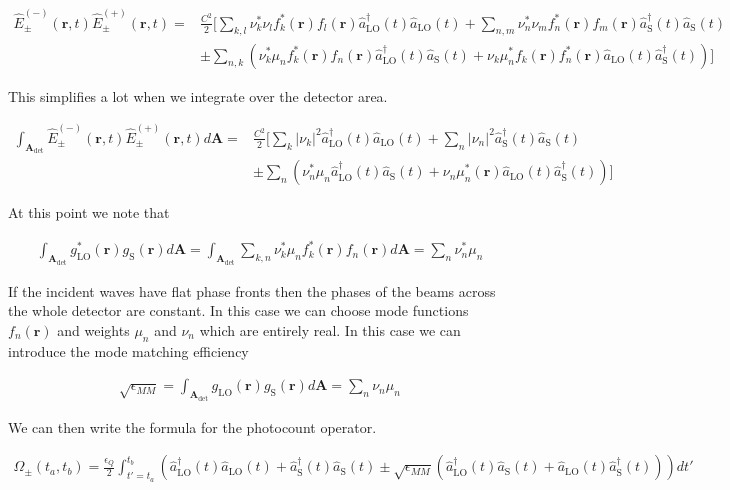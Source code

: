 \documentclass[12pt]{article}
\newcommand{\bv}[1]{\boldsymbol{#1}}
\begin{document}
\begin{align}
\hat{E}^{(-)}_{\pm}(\bv{r},t)\hat{E}^{(+)}_{\pm}(\bv{r},t) =& \frac{C^2}{2}\Bigg[ \sum_{k,l} \nu_k^* \nu_l f_k^*(\bv{r}) f_l(\bv{r}) \hat{a}^{\dag}_{\text{LO}}(t) \hat{a}_{\text{LO}}(t) + \sum_{n,m} \nu_n^* \nu_m f_n^*(\bv{r}) f_m(\bv{r}) \hat{a}^{\dag}_{\text{S}}(t) \hat{a}_{\text{S}}(t)\\
& \pm \sum_{n,k}\left(\nu_k^* \mu_n f_k^*(\bv{r})f_n(\bv{r}) \hat{a}^{\dag}_{\text{LO}}(t)\hat{a}_{\text{S}}(t) + \nu_k \mu_n^* f_k(\bv{r})f_n^*(\bv{r})\hat{a}_{\text{LO}}(t) \hat{a}^{\dag}_{\text{S}}(t)\right)\Bigg]
\end{align}

This simplifies a lot when we integrate over the detector area.

\begin{align}
\int_{\bv{A}_{\text{det}}} \hat{E}^{(-)}_{\pm}(\bv{r},t)\hat{E}^{(+)}_{\pm}(\bv{r},t) d\bv{A} =& \frac{C^2}{2} \Bigg[ \sum_{k} |\nu_k|^2 \hat{a}^{\dag}_{\text{LO}}(t) \hat{a}_{\text{LO}}(t) + \sum_{n} |\nu_n|^2  \hat{a}^{\dag}_{\text{S}}(t) \hat{a}_{\text{S}}(t)\\
& \pm \sum_{n}\left(\nu_n^* \mu_n \hat{a}^{\dag}_{\text{LO}}(t)\hat{a}_{\text{S}}(t) + \nu_n \mu_n^* (\bv{r})\hat{a}_{\text{LO}}(t) \hat{a}^{\dag}_{\text{S}}(t)\right)\Bigg]
\end{align}

At this point we note that

\begin{align}
\int_{\bv{A}_{\text{det}}} g_{\text{LO}}^*(\bv{r}) g_{\text{S}}(\bv{r})d\bv{A} = \int_{\bv{A}_{\text{det}}} \sum_{k,n} \nu_k^* \mu_n f_k^*(\bv{r}) f_n(\bv{r}) d\bv{A} = \sum_{n} \nu_n^* \mu_n
\end{align}

If the incident waves have flat phase fronts then the phases of the beams across the whole detector are constant. In this case we can choose mode functions $f_n(\bv{r})$ and weights $\mu_n$ and $\nu_n$ which are entirely real. In this case we can introduce the mode matching efficiency

\begin{align}
\sqrt{\epsilon_{MM}} = \int_{\bv{A}_{\text{det}}} g_{\text{LO}}(\bv{r}) g_{\text{S}}(\bv{r}) d\bv{A} = \sum_n \nu_n \mu_n
\end{align}

We can then write the formula for the photocount operator.

\begin{align}
\hat{\Omega}_{\pm}(t_a,t_b) = \frac{\epsilon_Q}{2} \int_{t' = t_a}^{t_b} \left(\hat{a}^{\dag}_{\text{LO}}(t) \hat{a}_{\text{LO}}(t) + \hat{a}^{\dag}_{\text{S}}(t) \hat{a}_{\text{S}}(t) \pm \sqrt{\epsilon_{MM}} \left(\hat{a}^{\dag}_{\text{LO}}(t)\hat{a}_{\text{S}}(t) + \hat{a}_{\text{LO}}(t)\hat{a}^{\dag}_{\text{S}}(t) \right) \right) dt'
\end{align}
\end{document}
